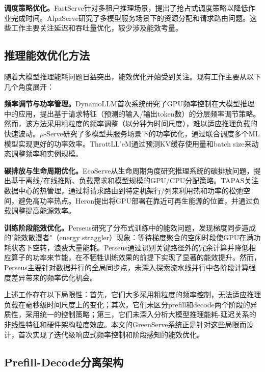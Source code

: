 \textbf{调度策略优化。}FastServe\cite{wu2023fast}针对多租户推理场景，提出了抢占式调度策略以降低作业完成时间。AlpaServe\cite{li2023alpaserve}研究了多模型服务场景下的资源分配和请求路由问题。这些工作主要关注延迟和吞吐量优化，较少涉及能效考量。

\subsection{推理能效优化方法}

随着大模型推理能耗问题日益突出，能效优化开始受到关注。现有工作主要从以下几个角度展开：

\textbf{频率调节与功率管理。}DynamoLLM\cite{stojkovic2025dynamollm}首次系统研究了GPU频率控制在大模型推理中的应用，提出基于请求特征（预测的输入/输出token数）的分层频率调节策略。然而，该方法采用粗粒度的频率调整（以分钟为时间尺度），难以适应推理负载的快速波动。$\mu$-Serve\cite{qiu2024power}研究了多模型共服务场景下的功率优化，通过联合调度多个ML模型实现更好的功率效率。ThrottLL'eM\cite{kakolyris2025throttll}通过预测KV缓存使用量和batch size来动态调整频率和实例规模。

\textbf{碳排放与生命周期优化。}EcoServe\cite{li2025ecoserve}从生命周期角度研究推理系统的碳排放问题，提出基于离线/在线推断、负载需求和模型规模的GPU/CPU分配策略。TAPAS\cite{stojkovic2025tapas}关注数据中心的热管理，通过将请求路由到特定机架行/列来利用热和功率的松弛空间，避免高功率热点。Heron\cite{reddy2025ai}提出将GPU部署在靠近可再生能源的位置，并通过负载调整提高能源效率。

\textbf{训练阶段能效优化。}Perseus\cite{zhou2023perseus}研究了分布式训练中的能效问题，发现梯度同步造成的"能效散漫者"（energy straggler）现象：等待梯度聚合的空闲时段使GPU在满功耗状态下空转，浪费大量能耗。Perseus通过识别关键路径外的冗余计算并降低相应算子的功率来节能，在不牺牲训练效果的前提下实现了显著的能效提升。然而，Perseus主要针对数据并行的全局同步点，未深入探索流水线并行中各阶段计算强度差异带来的频率优化机会。

上述工作存在以下局限性：首先，它们大多采用粗粒度的频率控制，无法适应推理负载在毫秒级时间尺度上的变化；其次，它们未区分prefill和decode两个阶段的异质性，采用统一的控制策略；第三，它们未深入分析大模型推理能耗-延迟关系的非线性特征和硬件架构粒度效应。本文的GreenServe系统正是针对这些局限而设计，首次实现了迭代级响应式频率控制和阶段感知的能效优化。

\subsection{Prefill-Decode分离架构}

